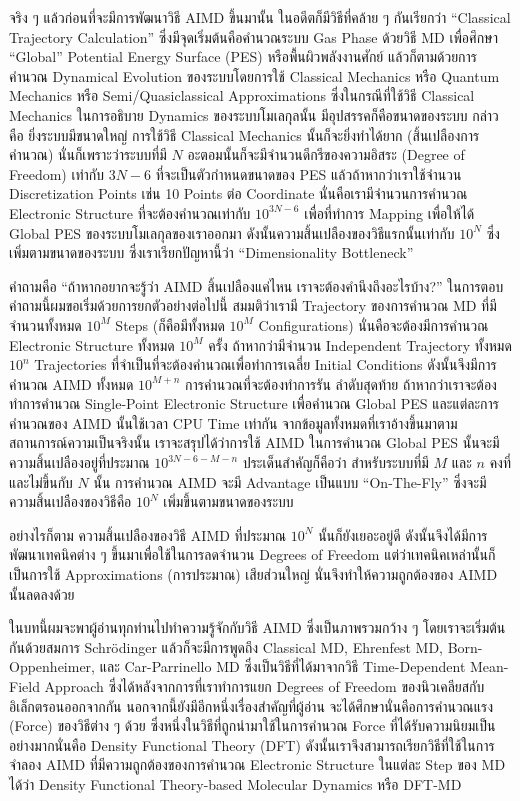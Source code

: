 จริง ๆ แล้วก่อนที่จะมีการพัฒนาวิธี AIMD ขึ้นมานั้น ในอดีตก็มีวิธีที่คล้าย ๆ กันเรียกว่า \enquote{Classical Trajectory Calculation}
ซึ่งมีจุดเริ่มต้นคือคำนวณระบบ Gas Phase ด้วยวิธี MD เพื่อศึกษา \enquote{Global} Potential Energy Surface (PES)
หรือพื้นผิวพลังงานศักย์ แล้วก็ตามด้วยการคำนวณ Dynamical Evolution ของระบบโดยการใช้ Classical Mechanics หรือ Quantum Mechanics
หรือ Semi/Quasiclassical Approximations ซึ่งในกรณีที่ใช้วิธี Classical Mechanics ในการอธิบาย Dynamics ของระบบโมเลกุลนั้น%
มีอุปสรรคก็คือขนาดของระบบ กล่าวคือ ยิ่งระบบมีขนาดใหญ่ การใช้วิธี Classical Mechanics นั้นก็จะยิ่งทำได้ยาก (สิ้นเปลืองการคำนวณ)
นั่นก็เพราะว่าระบบที่มี $N$ อะตอมนั้นก็จะมีจำนวนดีกรีของความอิสระ (Degree of Freedom) เท่ากับ $3N - 6$ ที่จะเป็นตัวกำหนดขนาดของ PES
แล้วถ้าหากว่าเราใช้จำนวน Discretization Points เช่น 10 Points ต่อ Coordinate นั่นคือเรามีจำนวนการคำนวณ Electronic Structure
ที่จะต้องคำนวณเท่ากับ $10^{3N - 6}$ เพื่อที่ทำการ Mapping เพื่อให้ได้ Global PES ของระบบโมเลกุลของเราออกมา
ดังนั้นความสิ้นเปลืองของวิธีแรกนั้นเท่ากับ $10^{N}$ ซึ่งเพิ่มตามขนาดของระบบ ซึ่งเราเรียกปัญหานี้ว่า \enquote{Dimensionality Bottleneck}

คำถามคือ \enquote{ถ้าหากอยากจะรู้ว่า AIMD สิ้นเปลืองแค่ไหน เราจะต้องคำนึงถึงอะไรบ้าง?} ในการตอบคำถามนี้ผมขอเริ่มด้วยการยกตัวอย่างต่อไปนี้
สมมติว่าเรามี Trajectory ของการคำนวณ MD ที่มีจำนวนทั้งหมด $10^{M}$ Steps (ก็คือมีทั้งหมด $10^{M}$ Configurations)
นั่นคือจะต้องมีการคำนวณ Electronic Structure ทั้งหมด $10^{M}$ ครั้ง ถ้าหากว่ามีจำนวน Independent Trajectory ทั้งหมด $10^{n}$
Trajectories ที่จำเป็นที่จะต้องคำนวณเพื่อทำการเฉลี่ย Initial Conditions ดังนั้นจึงมีการคำนวณ AIMD ทั้งหมด $10^{M + n}$
การคำนวณที่จะต้องทำการรัน ลำดับสุดท้าย ถ้าหากว่าเราจะต้องทำการคำนวณ Single-Point Electronic Structure เพื่อคำนวณ Global PES
และแต่ละการคำนวณของ AIMD นั้นใช้เวลา CPU Time เท่ากัน จากข้อมูลทั้งหมดที่เราอ้างขึ้นมาตามสถานการณ์ความเป็นจริงนั้น เราจะสรุปได้ว่าการใช้
AIMD ในการคำนวณ Global PES นั้นจะมีความสิ้นเปลืองอยู่ที่ประมาณ $10^{3N-6-M-n}$ ประเด็นสำคัญก็คือว่า สำหรับระบบที่มี $M$ และ $n$
คงที่และไม่ขึ้นกับ $N$ นั้น การคำนวณ AIMD จะมี Advantage เป็นแบบ \enquote{On-The-Fly} ซึ่งจะมีความสิ้นเปลืองของวิธีคือ $10^{N}$
เพิ่มขึ้นตามขนาดของระบบ

อย่างไรก็ตาม ความสิ้นเปลืองของวิธี AIMD ที่ประมาณ $10^{N}$ นั้นก็ยังเยอะอยู่ดี ดังนั้นจึงได้มีการพัฒนาเทคนิคต่าง ๆ ขึ้นมาเพื่อใช้ในการลดจำนวน
Degrees of Freedom แต่ว่าเทคนิคเหล่านั้นก็เป็นการใช้ Approximations (การประมาณ) เสียส่วนใหญ่ นั่นจึงทำให้ความถูกต้องของ AIMD นั้นลดลงด้วย

ในบทนี้ผมจะพาผู้อ่านทุกท่านไปทำความรู้จักกับวิธี AIMD ซึ่งเป็นภาพรวมกว้าง ๆ โดยเราจะเริ่มต้นกันด้วยสมการ Schr\"{o}dinger แล้วก็จะมีการพูดถึง
Classical MD, Ehrenfest MD, Born-Oppenheimer, และ Car-Parrinello MD ซึ่งเป็นวิธีที่ได้มาจากวิธี Time-Dependent Mean-Field
Approach ซึ่งได้หลังจากการที่เราทำการแยก Degrees of Freedom ของนิวเคลียสกับอิเล็กตรอนออกจากกัน นอกจากนี้ยังมีอีกหนึ่งเรื่องสำคัญที่ผู้อ่าน%
จะได้ศึกษานั่นคือการคำนวณแรง (Force) ของวิธีต่าง ๆ ด้วย ซึ่งหนึ่งในวิธีที่ถูกนำมาใช้ในการคำนวณ Force ที่ได้รับความนิยมเป็นอย่างมากนั่นคือ
Density Functional Theory (DFT) ดังนั้นเราจึงสามารถเรียกวิธีที่ใช้ในการจำลอง AIMD ที่มีความถูกต้องของการคำนวณ Electronic Structure
ในแต่ละ Step ของ MD ได้ว่า Density Functional Theory-based Molecular Dynamics หรือ DFT-MD

